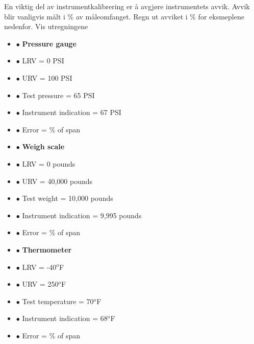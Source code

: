 


En viktig del av instrumentkalibrering er å avgjøre instrumentets avvik. Avvik blir vanligvis målt i \% av måleomfanget. Regn ut avviket i \% for eksmeplene nedenfor. 
\medskip
Vis utregningene

\begin{itemize}
\item{$\bullet$} {\bf Pressure gauge}
\item{$\bullet$} LRV = 0 PSI
\item{$\bullet$} URV = 100 PSI 
\item{$\bullet$} Test pressure = 65 PSI 
\item{$\bullet$} Instrument indication = 67 PSI
\item{$\bullet$} Error = \underbar{\hskip 50pt} \% of span
\medskip
\end{itemize}

\vskip 10pt

\begin{itemize}
\item{$\bullet$} {\bf Weigh scale}
\item{$\bullet$} LRV = 0 pounds
\item{$\bullet$} URV = 40,000 pounds
\item{$\bullet$} Test weight = 10,000 pounds
\item{$\bullet$} Instrument indication = 9,995 pounds
\item{$\bullet$} Error = \underbar{\hskip 50pt} \% of span
\medskip
\end{itemize}

\vskip 10pt

\begin{itemize}
\item{$\bullet$} {\bf Thermometer}
\item{$\bullet$} LRV = -40$^{o}$F
\item{$\bullet$} URV = 250$^{o}$F
\item{$\bullet$} Test temperature = 70$^{o}$F
\item{$\bullet$} Instrument indication = 68$^{o}$F
\item{$\bullet$} Error = \underbar{\hskip 50pt} \% of span
\medskip
\end{itemize}

